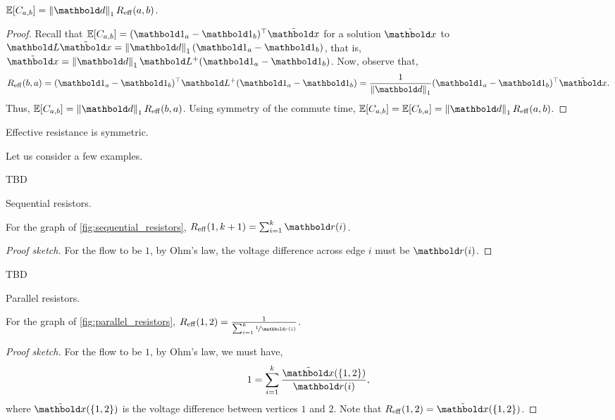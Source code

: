 \begin{lem}
$\E{C_{a,b}} = \norm{\vd}_1 \Reff(a,b)$.
\end{lem}
\begin{proof} Recall that $\E{C_{a,b}} = \trans{(\vOne_a - \vOne_b)}\elx$ for a solution $\elx$ to $\mL\elx = \norm{\vd}_1 (\vOne_a - \vOne_b)$, that is, $\elx = \norm{\vd}_1\pinv{\mL}(\vOne_a - \vOne_b)$. Now, observe that, \begin{align*}
    \Reff(b,a) = \trans{(\vOne_a - \vOne_b)}\pinv{\mL}(\vOne_a - \vOne_b) = \frac{1}{\norm{\vd}_1}\trans{(\vOne_a - \vOne_b)}\elx.
\end{align*} Thus, $\E{C_{a,b}} = \norm{\vd}_1 \Reff(b,a)$. Using symmetry of the commute time, $\E{C_{a,b}} = \E{C_{b,a}} = \norm{\vd}_1 \Reff(a,b)$.
\end{proof}

\begin{cor}\label{cor:effective_resistance_symmetric}
Effective resistance is symmetric.
\end{cor}

Let us consider a few examples.

\begin{marginfigure}
TBD
\caption{Sequential resistors.}\label{fig:sequential_resistors}
\end{marginfigure}
\begin{lem}
For the graph of \cref{fig:sequential_resistors}, $\Reff(1,k+1) = \sum_{i=1}^k \vr(i)$.
\end{lem}
\begin{proof}[Proof sketch] For the flow to be $1$, by Ohm's law, the voltage difference across edge $i$ must be $\vr(i)$.
\end{proof}

\begin{marginfigure}
TBD
\caption{Parallel resistors.}\label{fig:parallel_resistors}
\end{marginfigure}
\begin{lem}
For the graph of \cref{fig:parallel_resistors}, $\Reff(1,2) = \frac{1}{\sum_{i=1}^k \nicefrac{1}{\vr(i)}}$.
\end{lem}
\begin{proof}[Proof sketch] For the flow to be $1$, by Ohm's law, we must have, \begin{align*}
    1 = \sum_{i=1}^k \frac{\elx(\{1,2\})}{\vr(i)},
\end{align*} where $\elx(\{1,2\})$ is the voltage difference between vertices $1$ and $2$. Note that $\Reff(1,2) = \elx(\{1,2\})$.
\end{proof}

